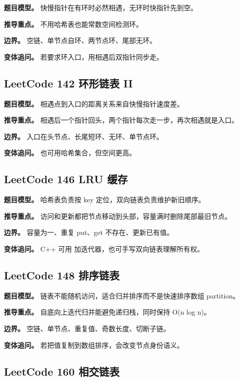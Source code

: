 \textbf{题目模型。} 快慢指针在有环时必然相遇，无环时快指针先到空。

\textbf{推导重点。} 不用哈希表也能常数空间检测环。

\textbf{边界。} 空链、单节点自环、两节点环、尾部无环。

\textbf{变体追问。} 若要求环入口，用相遇后双指针同步走。

\subsection{LeetCode 142 环形链表 II}

\textbf{题目模型。} 相遇点到入口的距离关系来自快慢指针速度差。

\textbf{推导重点。} 相遇后一个指针回头，两个指针每次走一步，再次相遇就是入口。

\textbf{边界。} 入口在头节点、长尾短环、无环、单节点环。

\textbf{变体追问。} 也可用哈希集合，但空间更高。

\subsection{LeetCode 146 LRU 缓存}

\textbf{题目模型。} 哈希表负责按 key 定位，双向链表负责维护新旧顺序。

\textbf{推导重点。} 访问和更新都把节点移动到头部，容量满时删除尾部最旧节点。

\textbf{边界。} 容量为一、重复 put、get 不存在、更新已有值。

\textbf{变体追问。} C++ 可用  加迭代器，也可手写双向链表理解所有权。

\subsection{LeetCode 148 排序链表}

\textbf{题目模型。} 链表不能随机访问，适合归并排序而不是快速排序数组 partition。

\textbf{推导重点。} 自底向上迭代归并能避免递归栈，同时保持 O(n log n)。

\textbf{边界。} 空链、单节点、重复值、奇数长度、切断子链。

\textbf{变体追问。} 若把值复制到数组排序，会改变节点身份语义。

\subsection{LeetCode 160 相交链表}

